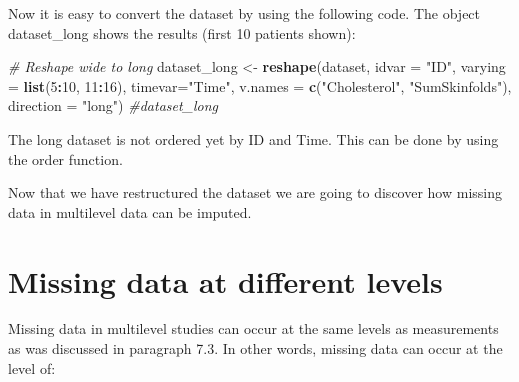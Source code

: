 \documentclass[]{book}
\newenvironment{Shaded}{\begin{snugshade}}{\end{snugshade}}
\newcommand{\KeywordTok}[1]{\textcolor[rgb]{0.13,0.29,0.53}{\textbf{#1}}}
\newcommand{\DataTypeTok}[1]{\textcolor[rgb]{0.13,0.29,0.53}{#1}}
\newcommand{\DecValTok}[1]{\textcolor[rgb]{0.00,0.00,0.81}{#1}}
\newcommand{\StringTok}[1]{\textcolor[rgb]{0.31,0.60,0.02}{#1}}
\newcommand{\CommentTok}[1]{\textcolor[rgb]{0.56,0.35,0.01}{\textit{#1}}}
\newcommand{\OperatorTok}[1]{\textcolor[rgb]{0.81,0.36,0.00}{\textbf{#1}}}
\newcommand{\NormalTok}[1]{#1}
\begin{document}
Now it is easy to convert the dataset by using the following code. The
object dataset\_long shows the results (first 10 patients shown):

\begin{Shaded}
\begin{Highlighting}[]
\CommentTok{# Reshape wide to long}
\NormalTok{dataset_long <-}\StringTok{ }\KeywordTok{reshape}\NormalTok{(dataset, }\DataTypeTok{idvar =} \StringTok{"ID"}\NormalTok{, }\DataTypeTok{varying =} \KeywordTok{list}\NormalTok{(}\DecValTok{5}\OperatorTok{:}\DecValTok{10}\NormalTok{, }\DecValTok{11}\OperatorTok{:}\DecValTok{16}\NormalTok{), }\DataTypeTok{timevar=}\StringTok{"Time"}\NormalTok{, }
         \DataTypeTok{v.names =} \KeywordTok{c}\NormalTok{(}\StringTok{"Cholesterol"}\NormalTok{, }\StringTok{"SumSkinfolds"}\NormalTok{), }\DataTypeTok{direction =} \StringTok{"long"}\NormalTok{)}
\CommentTok{#dataset_long}
\end{Highlighting}
\end{Shaded}

The long dataset is not ordered yet by ID and Time. This can be done by
using the order function.

\begin{Shaded}
\end{Shaded}

Now that we have restructured the dataset we are going to discover how
missing data in multilevel data can be imputed.

\section{Missing data at different
levels}\label{missing-data-at-different-levels}

Missing data in multilevel studies can occur at the same levels as
measurements as was discussed in paragraph 7.3. In other words, missing
data can occur at the level of:
\end{document}
